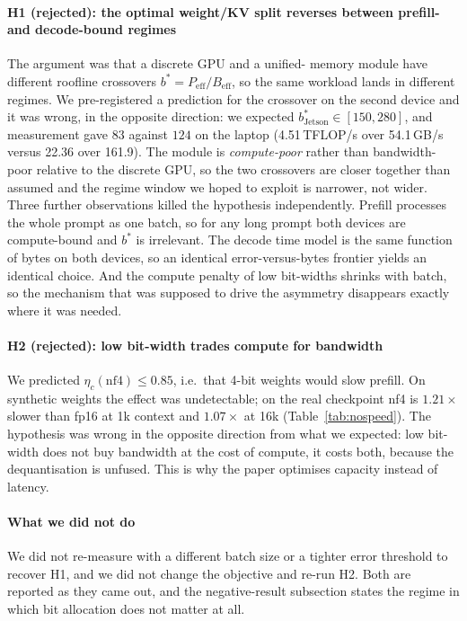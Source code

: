 \documentclass[5p]{elsarticle}
\begin{document}
\paragraph*{H1 (rejected): the optimal weight/KV split reverses between prefill-
and decode-bound regimes} The argument was that a discrete GPU and a unified-
memory module have different roofline crossovers $b^* = P_{\mathrm{eff}} /
B_{\mathrm{eff}}$, so the same workload lands in different regimes. We
pre-registered a prediction for the crossover on the second device and it was
wrong, in the opposite direction: we expected $b^*_{\mathrm{Jetson}} \in
[150, 280]$, and measurement gave $83$ against $124$ on the laptop
(4.51\,TFLOP/s over 54.1\,GB/s versus 22.36 over 161.9). The module is
\emph{compute-poor} rather than bandwidth-poor relative to the discrete GPU, so
the two crossovers are closer together than assumed and the regime window we
hoped to exploit is narrower, not wider. Three further observations killed the
hypothesis independently. Prefill processes the whole prompt as one batch, so for
any long prompt both devices are compute-bound and $b^*$ is irrelevant. The
decode time model is the same function of bytes on both devices, so an identical
error-versus-bytes frontier yields an identical choice. And the compute penalty
of low bit-widths shrinks with batch, so the mechanism that was supposed to drive
the asymmetry disappears exactly where it was needed.

\paragraph*{H2 (rejected): low bit-width trades compute for bandwidth} We
predicted $\eta_c(\text{nf4}) \le 0.85$, i.e.\ that 4-bit weights would slow
prefill. On synthetic weights the effect was undetectable; on the real checkpoint
nf4 is $1.21\times$ slower than fp16 at 1k context and $1.07\times$ at 16k
(Table~\ref{tab:nospeed}). The hypothesis was wrong in the opposite direction
from what we expected: low bit-width does not buy bandwidth at the cost of
compute, it costs both, because the dequantisation is unfused. This is why the
paper optimises capacity instead of latency.

\paragraph*{What we did not do} We did not re-measure with a different batch size
or a tighter error threshold to recover H1, and we did not change the objective
and re-run H2. Both are reported as they came out, and the negative-result
subsection states the regime in which bit allocation does not matter at all.
\end{document}
